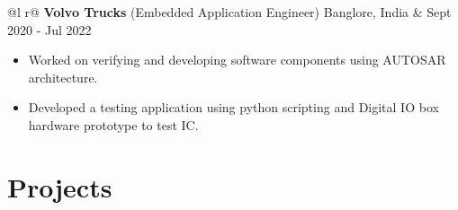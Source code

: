 \documentclass[a4paper,10pt]{article}
\begin{document}
\begin{tabularx}{\linewidth}{ @{}l r@{} }
    \textbf{Volvo Trucks} (Embedded Application Engineer) Banglore, India & \hfill {\small Sept 2020 - Jul 202}2 \\[2.75pt]
    {
        \begin{minipage}[t]{\linewidth}
            \begin{itemize}[nosep,after=\strut, leftmargin=2em, itemsep=3pt]
                \item Worked on verifying and developing software components using AUTOSAR architecture. %
                \item Developed a testing application using python scripting and Digital IO box hardware prototype to test IC.
            \end{itemize}
        \end{minipage}
    }
\end{tabularx}

\section{Projects}
\end{document}
